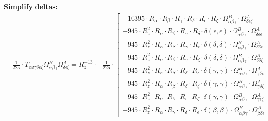 \documentclass{article}
\begin{document}
\textbf{Simplify deltas:}
\begin{subequations}\begin{gather}
- \frac{1}{225} \cdot T_{\alpha{}\beta{}\gamma{}\delta{}\epsilon{}\zeta{}} \Omega{}^{B}_{\alpha{}\beta{}\gamma{}} \Omega{}^{A}_{\delta{}\epsilon{}\zeta{}} = R_{z}^{-13} \cdot - \frac{1}{225} \cdot  \left[ \begin{array}{c} 
 		+ 10395 \cdot R_{\alpha{}} \cdot R_{\beta{}} \cdot R_{\gamma{}} \cdot R_{\delta{}} \cdot R_{\epsilon{}} \cdot R_{\zeta{}} \cdot \Omega{}^{B}_{\alpha{}\beta{}\gamma{}} \cdot \Omega{}^{A}_{\delta{}\epsilon{}\zeta{}} 
 \\[0.2em] 		 - 945 \cdot R_{z}^{2} \cdot R_{\alpha{}} \cdot R_{\beta{}} \cdot R_{\gamma{}} \cdot R_{\delta{}} \cdot \delta{}\left(\epsilon{}, \epsilon{}\right) \cdot \Omega{}^{B}_{\alpha{}\beta{}\gamma{}} \cdot \Omega{}^{A}_{\delta{}\epsilon{}\epsilon{}} 
 \\[0.2em] 		 - 945 \cdot R_{z}^{2} \cdot R_{\alpha{}} \cdot R_{\beta{}} \cdot R_{\gamma{}} \cdot R_{\epsilon{}} \cdot \delta{}\left(\delta{}, \delta{}\right) \cdot \Omega{}^{B}_{\alpha{}\beta{}\gamma{}} \cdot \Omega{}^{A}_{\delta{}\delta{}\epsilon{}} 
 \\[0.2em] 		 - 945 \cdot R_{z}^{2} \cdot R_{\alpha{}} \cdot R_{\beta{}} \cdot R_{\gamma{}} \cdot R_{\zeta{}} \cdot \delta{}\left(\delta{}, \delta{}\right) \cdot \Omega{}^{B}_{\alpha{}\beta{}\gamma{}} \cdot \Omega{}^{A}_{\delta{}\delta{}\zeta{}} 
 \\[0.2em] 		 - 945 \cdot R_{z}^{2} \cdot R_{\alpha{}} \cdot R_{\beta{}} \cdot R_{\delta{}} \cdot R_{\epsilon{}} \cdot \delta{}\left(\gamma{}, \gamma{}\right) \cdot \Omega{}^{B}_{\alpha{}\beta{}\gamma{}} \cdot \Omega{}^{A}_{\gamma{}\delta{}\epsilon{}} 
 \\[0.2em] 		 - 945 \cdot R_{z}^{2} \cdot R_{\alpha{}} \cdot R_{\beta{}} \cdot R_{\delta{}} \cdot R_{\zeta{}} \cdot \delta{}\left(\gamma{}, \gamma{}\right) \cdot \Omega{}^{B}_{\alpha{}\beta{}\gamma{}} \cdot \Omega{}^{A}_{\gamma{}\delta{}\zeta{}} 
 \\[0.2em] 		 - 945 \cdot R_{z}^{2} \cdot R_{\alpha{}} \cdot R_{\beta{}} \cdot R_{\epsilon{}} \cdot R_{\zeta{}} \cdot \delta{}\left(\gamma{}, \gamma{}\right) \cdot \Omega{}^{B}_{\alpha{}\beta{}\gamma{}} \cdot \Omega{}^{A}_{\gamma{}\epsilon{}\zeta{}} 
 \\[0.2em] 		 - 945 \cdot R_{z}^{2} \cdot R_{\alpha{}} \cdot R_{\gamma{}} \cdot R_{\delta{}} \cdot R_{\epsilon{}} \cdot \delta{}\left(\beta{}, \beta{}\right) \cdot \Omega{}^{B}_{\alpha{}\beta{}\gamma{}} \cdot \Omega{}^{A}_{\beta{}\delta{}\epsilon{}} 

\end{array}
\end{gather}
\end{subequations}
\end{document}
